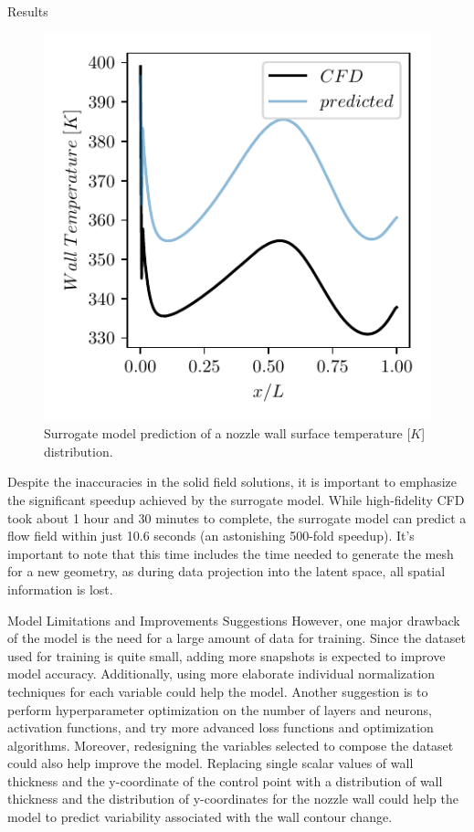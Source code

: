 \begin{frame}{Results}
\begin{figure}
\hypertarget{fig:wall_temperature_solid_wall}{%
\centering
\includegraphics{figures/predicted_wall_temperature.pdf}
\caption{Surrogate model prediction of a nozzle wall surface temperature
{[}\(K\){]} distribution.}\label{fig:wall_temperature_solid_wall}
}
\end{figure}

Despite the inaccuracies in the solid field solutions, it is important
to emphasize the significant speedup achieved by the surrogate model.
While high-fidelity CFD took about 1 hour and 30 minutes to complete,
the surrogate model can predict a flow field within just 10.6 seconds
(an astonishing 500-fold speedup). It's important to note that this time
includes the time needed to generate the mesh for a new geometry, as
during data projection into the latent space, all spatial information is
lost.

\begin{block}{Model Limitations and Improvements Suggestions}
\protect\hypertarget{model-limitations-and-improvements-suggestions}{}
However, one major drawback of the model is the need for a large amount
of data for training. Since the dataset used for training is quite
small, adding more snapshots is expected to improve model accuracy.
Additionally, using more elaborate individual normalization techniques
for each variable could help the model. Another suggestion is to perform
hyperparameter optimization on the number of layers and neurons,
activation functions, and try more advanced loss functions and
optimization algorithms. Moreover, redesigning the variables selected to
compose the dataset could also help improve the model. Replacing single
scalar values of wall thickness and the y-coordinate of the control
point with a distribution of wall thickness and the distribution of
y-coordinates for the nozzle wall could help the model to predict
variability associated with the wall contour change.
\end{block}
\end{frame}

